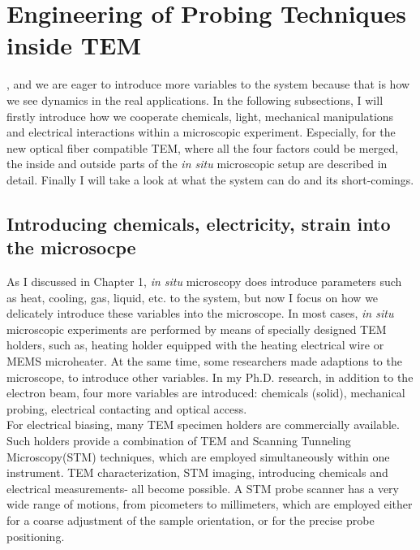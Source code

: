 

\chapter{Engineering of Probing Techniques inside TEM}

, and we are eager to introduce more variables to the system because that is how we see dynamics in the real applications.
In the following subsections, I will firstly introduce how we cooperate chemicals, light, mechanical manipulations and electrical interactions within a microscopic experiment. 
Especially, for the new optical fiber compatible TEM, where all the four factors could be merged, the inside and outside parts of the \emph{in situ} microscopic setup are described in detail. 
Finally I will take a look at what the system can do and its short-comings. 

\section{Introducing chemicals, electricity, strain into the microsocpe}

As I discussed in Chapter 1, \emph{in situ} microscopy does introduce parameters such as heat, cooling, gas, liquid, etc. to the system, but now I focus on how we delicately introduce these variables into the  microscope. In most cases, {\em in situ} microscopic experiments are performed by means of specially designed TEM holders, such as, heating holder equipped with the heating electrical wire or MEMS microheater. At the same time, some researchers made adaptions to the microscope, to introduce other variables. In my Ph.D. research, in addition to the electron beam, four more variables are introduced: chemicals (solid), mechanical probing, electrical contacting and optical access. \\

For electrical biasing, many TEM specimen holders are commercially available. Such holders provide a combination of TEM and Scanning Tunneling Microscopy(STM) techniques, which are employed simultaneously within one instrument. TEM characterization, STM imaging, introducing chemicals and electrical measurements- all become possible. A STM probe scanner has a very wide range of motions, from picometers to millimeters, which are employed either for a coarse adjustment of the sample orientation, or for the precise probe positioning. \\

